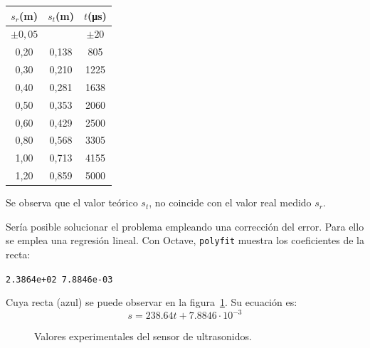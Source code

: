 \documentclass[10pt,a4paper,hidelinks,twocolumn,nobalancelastpage]{article}
\begin{document}
\begin{table}[h]
\centering
\begin{tabular}{ | c | c | c | }
\hline
$s_{r}$(m) & $s_{t}$(m) & $t$(\si{\micro\second}) \\ \hline
$\pm 0,05$ &  & $\pm 20$ \\ \hline \hline
0,20 & 0,138 &  805 \\ \hline
0,30 & 0,210 & 1225 \\ \hline
0,40 & 0,281 & 1638 \\ \hline
0,50 & 0,353 & 2060 \\ \hline
0,60 & 0,429 & 2500 \\ \hline
0,80 & 0,568 & 3305 \\ \hline
1,00 & 0,713 & 4155 \\ \hline
1,20 & 0,859 & 5000 \\ \hline
\end{tabular}
\end{table}

Se observa que el valor teórico $s_t$, no coincide con el valor real medido 
$s_r$.

Sería posible solucionar el problema empleando una corrección del error. Para 
ello se emplea una regresión lineal. Con Octave, \texttt{polyfit} muestra los 
coeficientes de la recta:
\begin{center}
\texttt{2.3864e+02   7.8846e-03}
\end{center}
Cuya recta (azul) se puede observar en la figura~\ref{fig:sonar_plot}. Su 
ecuación es:
$$s = 238.64t + 7.8846\cdot10^{-3}$$

\begin{figure}
\caption{Valores experimentales del sensor de ultrasonidos.\label{fig:sonar_plot}}
\end{figure}
\end{document}
